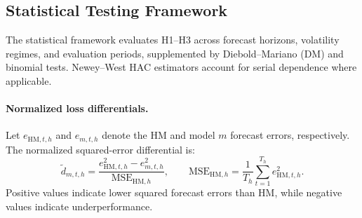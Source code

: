 \documentclass[runningheads,orivec]{llncs}
\begin{document}
\subsection{Statistical Testing Framework}\label{subsec:hypothesis_testing}

The statistical framework evaluates H1--H3 across forecast horizons, volatility regimes, and evaluation periods, supplemented by Diebold--Mariano (DM) and binomial tests. Newey--West HAC estimators account for serial dependence where applicable.

\paragraph{Normalized loss differentials.} Let $e_{\mathrm{HM},t,h}$ and $e_{m,t,h}$ denote the HM and model $m$ forecast errors, respectively. The normalized squared-error differential is:
\begin{equation}\label{eq:norm_loss_diff}
\widetilde d_{m,t,h}
=
\frac{e^2_{\mathrm{HM},t,h}-e^2_{m,t,h}}
{\mathrm{MSE}_{\mathrm{HM},h}},
\qquad
\mathrm{MSE}_{\mathrm{HM},h}
=
\frac{1}{T_h}\sum_{t=1}^{T_h}e^2_{\mathrm{HM},t,h}.
\end{equation}
Positive values indicate lower squared forecast errors than HM, while negative values indicate underperformance.
\end{document}
